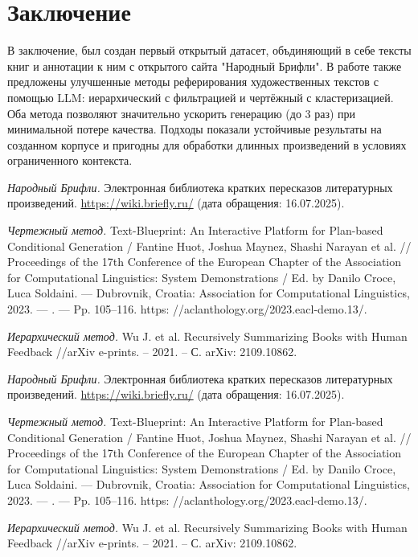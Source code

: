 \documentclass{article}
\theoremstyle{definition}
\theoremstyle{plain}
\begin{document}
\FloatBarrier
\section*{Заключение}
В заключение, был создан первый открытый датасет, объдиняющий в себе тексты книг и аннотации к ним с открытого сайта "Народный Брифли".
В работе также предложены улучшенные методы реферирования художественных текстов с помощью LLM: 
иерархический с фильтрацией и чертёжный с кластеризацией.
Оба метода позволяют значительно ускорить генерацию (до 3 раз) при минимальной потере качества. 
Подходы показали устойчивые результаты на созданном корпусе и пригодны для обработки длинных произведений в условиях ограниченного контекста.


\begin{thebibliography}{99}
\textit{Народный Брифли.}  
Электронная библиотека кратких пересказов литературных произведений.  
\url{https://wiki.briefly.ru/} (дата обращения: 16.07.2025).


\textit{Чертежный метод.}  
Text-Blueprint: An Interactive Platform for Plan-based Conditional Generation / Fantine Huot, Joshua Maynez, Shashi Narayan et al. // Proceedings of the 17th Conference of the European Chapter of the Association for Computational Linguistics:
System Demonstrations / Ed. by Danilo Croce, Luca Soldaini. — Dubrovnik, Croatia: Association for Computational Linguistics, 2023. — . — Pp. 105–116. https:
//aclanthology.org/2023.eacl-demo.13/.

\textit{Иерархический метод.}  
Wu J. et al. Recursively Summarizing Books with Human Feedback //arXiv e-prints. – 2021. – С. arXiv: 2109.10862.

\end{thebibliography}

\renewcommand\refname{References}


\begin{thebibliography}{99}
\textit{Народный Брифли.}  
Электронная библиотека кратких пересказов литературных произведений.  
\url{https://wiki.briefly.ru/} (дата обращения: 16.07.2025).

\textit{Чертежный метод.}  
Text-Blueprint: An Interactive Platform for Plan-based Conditional Generation / Fantine Huot, Joshua Maynez, Shashi Narayan et al. // Proceedings of the 17th Conference of the European Chapter of the Association for Computational Linguistics:
System Demonstrations / Ed. by Danilo Croce, Luca Soldaini. — Dubrovnik, Croatia: Association for Computational Linguistics, 2023. — . — Pp. 105–116. https:
//aclanthology.org/2023.eacl-demo.13/.

\textit{Иерархический метод.}  
Wu J. et al. Recursively Summarizing Books with Human Feedback //arXiv e-prints. – 2021. – С. arXiv: 2109.10862.

\end{thebibliography}
\end{document}
